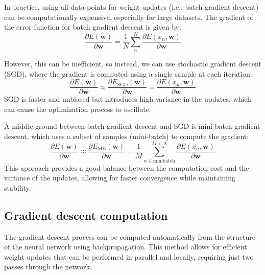 In practice, using all data points for weight updates (i.e., batch gradient descent) can be computationally expensive, especially for large datasets. 
The gradient of the error function for batch gradient descent is given by:
\[\dfrac{\partial E(\mathbf{w})}{\partial \mathbf{w}}=\dfrac{1}{N}\sum_n^N\dfrac{\partial E(x_n,\mathbf{w})}{\partial\mathbf{w}}\]

However, this can be inefficient, so instead, we can use stochastic gradient descent (SGD), where the gradient is computed using a single sample at each iteration:
\[\dfrac{\partial E(\mathbf{w})}{\partial \mathbf{w}}\approx\dfrac{\partial E_{\text{SGD}}(\mathbf{w})}{\partial \mathbf{w}}=\dfrac{\partial E(x_n,\mathbf{w})}{\partial\mathbf{w}}\]
SGD is faster and unbiased but introduces high variance in the updates, which can cause the optimization process to oscillate.

A middle ground between batch gradient descent and SGD is mini-batch gradient descent, which uses a subset of samples (mini-batch) to compute the gradient:
\[\dfrac{\partial E(\mathbf{w})}{\partial \mathbf{w}}\approx\dfrac{\partial E_{\text{MB}}(\mathbf{w})}{\partial \mathbf{w}}=\dfrac{1}{M}\sum_{n\in\text{minibatch}}^{M<N}\dfrac{\partial E(x_n,\mathbf{w})}{\partial\mathbf{w}}\]
This approach provides a good balance between the computation cost and the variance of the updates, allowing for faster convergence while maintaining stability.

\subsection{Gradient descent computation}
The gradient descent process can be computed automatically from the structure of the neural network using backpropagation.
This method allows for efficient weight updates that can be performed in parallel and locally, requiring just two passes through the network.

